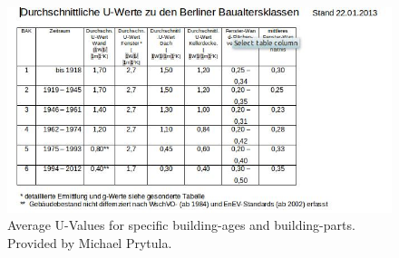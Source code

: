 \begin{figure}[h]
	\centering
 	 \includegraphics[scale=0.59]{phase2/group1/u-values_table.jpg}
	\caption{Average U-Values for specific building-ages and building-parts. Provided by Michael Prytula.}
	\label{fig:uValuesTable}
\end{figure}


